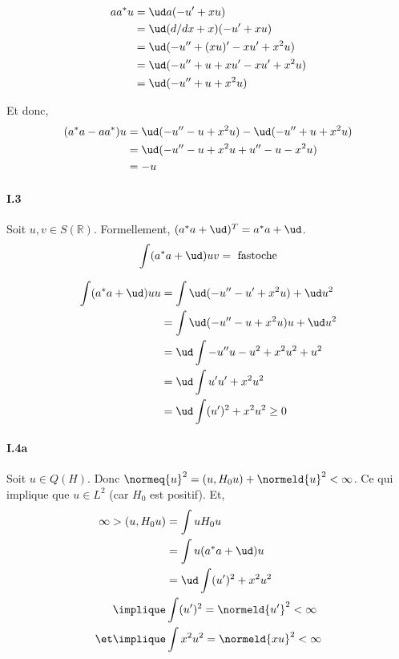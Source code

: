 \begin{align}
    a a^* u &= \ud a (-u' + xu) \\
    &= \ud (d/dx + x) (-u' + xu) \\
    &= \ud (-u'' + (xu)' - xu' + x^2u) \\
    &= \ud (-u'' + u + xu' - xu' + x^2u) \\
    &= \ud (-u'' + u + x^2u)
\end{align}

Et donc,
\begin{align}
    (a^* a - a a^*) u &= \ud (-u'' - u + x^2u) - \ud (-u'' + u + x^2u) \\
    &= \ud (-u'' - u + x^2u +u'' - u - x^2u) \\
    &= -u
\end{align}

\paragraph{I.3}

Soit $u, v \in S(\mathbb{R})$. Formellement, $(a^*a + \ud)^T = a^*a + \ud$.
\begin{align}
    \int (a^* a + \ud) u v = \text{ fastoche}
\end{align}

\begin{align}
    \int (a^* a + \ud) u u &= \int \ud (-u'' - u' + x^2u) + \ud u^2 \\
    &= \int \ud (-u'' - u + x^2u)u + \ud u^2 \\
    &= \ud \int -u''u - u^2 + x^2u^2 + u^2 \\
    &= \ud \int u'u' + x^2u^2 \\
    &= \ud \int (u')^2 + x^2u^2 \geq 0
\end{align}

\paragraph{I.4a}

Soit $u \in Q(H)$. Donc $\normeq{u}^2 = (u, H_0 u) + \normeld{u}^2 < \infty$.
Ce qui implique que $u \in L^2$ (car $H_0$ est positif). Et,
\begin{align}
    \infty > (u, H_0 u) &= \int u H_0 u \\
    &= \int u (a^* a + \ud) u \\
    &= \ud \int (u')^2 + x^2u^2 \\
    \implique & \int (u')^2 = \normeld{u'}^2 < \infty \\
    \et \implique & \int x^2u^2 = \normeld{xu}^2 < \infty
\end{align}



